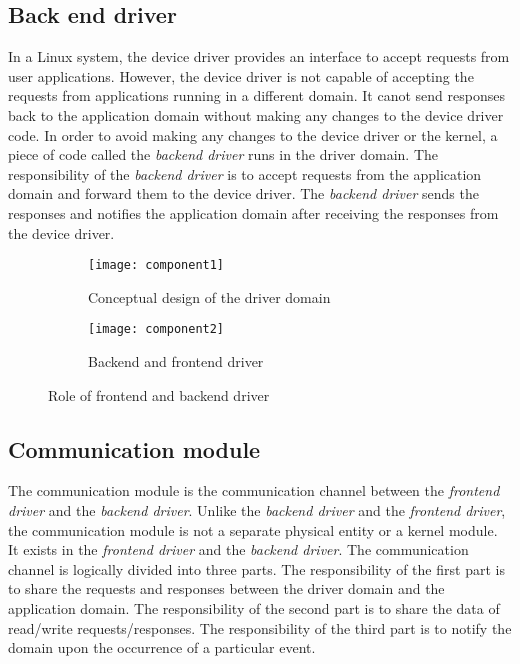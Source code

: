 \subsection{Back end driver}
\label{subsec:backend}
In a Linux system, the device driver provides an interface to accept requests from user applications. However, the device driver is not capable of accepting the requests from applications running in a different domain. It canot send responses back to the application domain without making any changes to the device driver code. In order to avoid making any changes to the device driver or the kernel, a piece of code called the \textit{backend driver} runs in the driver domain. The responsibility of the \textit{backend driver} is to accept requests from the application domain and forward them to the device driver. The \textit{backend driver} sends the responses and notifies the application domain after receiving the responses from the device driver.
\begin{figure}[!ht]
    \centering
    \begin{subfigure}[b]{0.45\textwidth}
	\texttt{[image: component1]}
	\caption{Conceptual design of the driver domain}
	\label{fig:conept}
    \end{subfigure}
	\hfill
    \begin{subfigure}[b]{0.45\textwidth}
	\texttt{[image: component2]}
	\caption{Backend and frontend driver}
	\label{fig:backendfrontend}
    \end{subfigure}
    \caption{Role of frontend and backend driver}\label{fig:fault tolerence}
\end{figure}

\subsection{Communication module}
The communication module is the communication channel between the \textit{frontend driver} and the \textit{backend driver}. Unlike the \textit{backend driver} and the \textit{frontend driver}, the communication module is not a separate physical entity or a kernel module. It exists in the \textit{frontend driver} and the \textit{backend driver}. The communication channel is logically divided into three parts. The responsibility of the first part is to share the requests and responses between the driver domain and the application domain. The responsibility of the second part is to share the data of read/write requests/responses. The responsibility of the third part is to notify the domain upon the occurrence of a particular event. 

